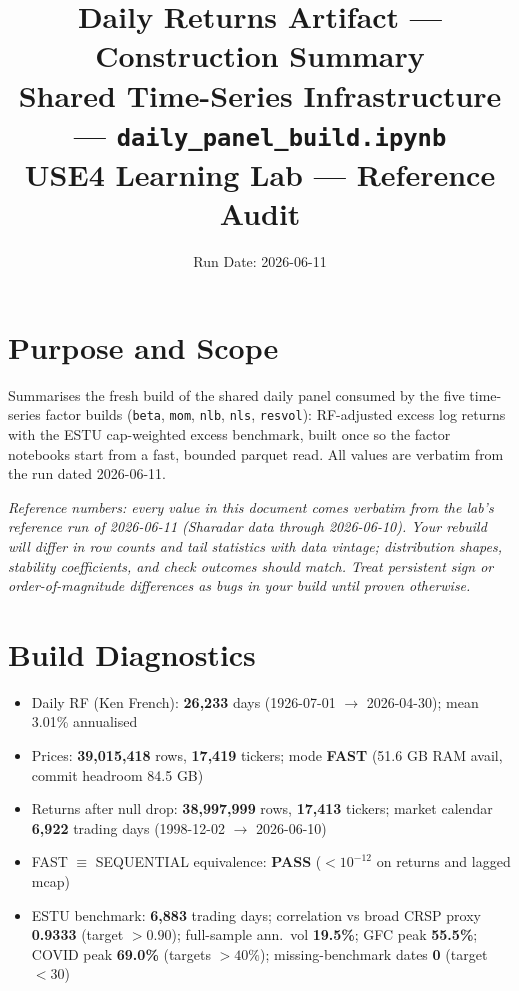 \documentclass[11pt,a4paper]{article}
\title{\textbf{Daily Returns Artifact --- Construction Summary}\\[2pt]
\large Shared Time-Series Infrastructure --- \texttt{daily\_panel\_build.ipynb}\\[4pt]
\normalsize USE4 Learning Lab --- Reference Audit}
\author{Run Date: 2026-06-11}
\date{}
\newcommand{\PASS}[1]{\textcolor{pass}{\textbf{#1}}}
\newcommand{\NOTE}[1]{\textcolor{note}{\textit{#1}}}
\begin{document}
\maketitle
\tableofcontents
\newpage

\section{Purpose and Scope}

Summarises the fresh build of the shared daily panel consumed by the five
time-series factor builds (\texttt{beta}, \texttt{mom}, \texttt{nlb},
\texttt{nls}, \texttt{resvol}): RF-adjusted excess log returns with the ESTU
cap-weighted excess benchmark, built once so the factor notebooks start from a
fast, bounded parquet read. All values are verbatim from the run dated
2026-06-11.

\NOTE{Reference numbers: every value in this document comes verbatim from the lab's reference run of 2026-06-11 (Sharadar data through 2026-06-10). Your rebuild will differ in row counts and tail statistics with data vintage; distribution shapes, stability coefficients, and check outcomes should match. Treat persistent sign or order-of-magnitude differences as bugs in your build until proven otherwise.}


\section{Build Diagnostics}

\begin{itemize}[leftmargin=*,topsep=2pt,itemsep=2pt]
  \item Daily RF (Ken French): \textbf{26{,}233} days (1926-07-01 $\to$
    2026-04-30); mean 3.01\% annualised
  \item Prices: \textbf{39{,}015{,}418} rows, \textbf{17{,}419} tickers;
    mode \textbf{FAST} (51.6 GB RAM avail, commit headroom 84.5 GB)
  \item Returns after null drop: \textbf{38{,}997{,}999} rows,
    \textbf{17{,}413} tickers; market calendar \textbf{6{,}922} trading days
    (1998-12-02 $\to$ 2026-06-10)
  \item FAST $\equiv$ SEQUENTIAL equivalence: \PASS{PASS} ($<10^{-12}$ on
    returns and lagged mcap)
  \item ESTU benchmark: \textbf{6{,}883} trading days; correlation vs broad
    CRSP proxy \textbf{0.9333} (target $>0.90$); full-sample ann.\ vol
    \textbf{19.5\%}; GFC peak \textbf{55.5\%}; COVID peak \textbf{69.0\%}
    (targets $>40\%$); missing-benchmark dates \textbf{0} (target $<30$)
\end{itemize}
\end{document}

